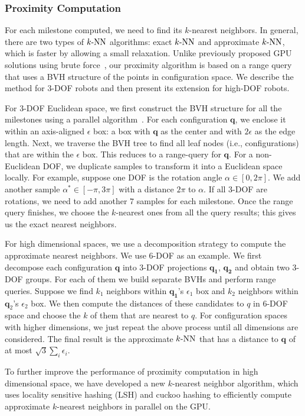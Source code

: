 \subsubsection{Proximity Computation}
For each milestone computed, we need to find its $k$-nearest neighbors. In general, there are two types of $k\text{-NN}$ algorithms: exact $k\text{-NN}$ and approximate $k\text{-NN}$, which is faster by allowing a small relaxation.
Unlike previously proposed GPU solutions using brute force~\cite{Garcia08}, our proximity algorithm is based on a range query that uses a BVH structure of the points in configuration space. We describe the method for 3-DOF robots and then present its extension for high-DOF robots.

For $3$-DOF Euclidean space, we first construct the BVH structure for all the milestones using a parallel algorithm~\cite{LauterbachGSLM09}. For each configuration $\mathbf{q}$, we enclose it within an axis-aligned $\epsilon$ box: a box with $\mathbf{q}$ as the center and with $2\epsilon$ as the edge length. Next, we traverse the BVH tree to find all leaf nodes (i.e., configurations) that are within the $\epsilon$ box. This reduces to a range-query for $\mathbf{q}$. For a non-Euclidean DOF, we duplicate samples to transform it into a Euclidean space locally. For example, suppose one DOF is the rotation angle $\alpha \in [0, 2\pi]$. We add another sample $\alpha^* \in [-\pi, 3\pi]$ with a distance $2\pi$ to $\alpha$. If all 3-DOF are rotations, we need to add another $7$ samples for each milestone. Once the range query finishes, we choose the $k$-nearest ones from all the query results; this gives us the exact nearest neighbors.

For high dimensional spaces, we use a decomposition strategy to compute the approximate nearest neighbors. We use $6$-DOF as an example. We first decompose each configuration $\mathbf{q}$ into $3$-DOF projections $\mathbf{q_1}$, $\mathbf{q_2}$ and obtain two $3$-DOF groups. For each of them we build separate BVHs and perform range queries. Suppose we find $k_1$ neighbors within $\mathbf{q_1}$'s $\epsilon_1$ box and $k_2$  neighbors within $\mathbf q_2$'s $\epsilon_2$ box. We then compute the distances of these candidates to $q$ in $6$-DOF space and choose the $k$ of them that are nearest to $q$. For configuration spaces with higher dimensions, we just repeat the above process until all dimensions are considered. The final result is the approximate $k\text{-NN}$ that has a distance to $\mathbf{q}$ of at most $\sqrt{3}\sum_i \epsilon_i$.

To further improve the performance of proximity computation in high dimensional space, we have developed a new $k$-nearest neighbor algorithm, which uses locality sensitive hashing (LSH) and cuckoo hashing to efficiently compute
approximate $k$-nearest neighbors in parallel on the GPU.

